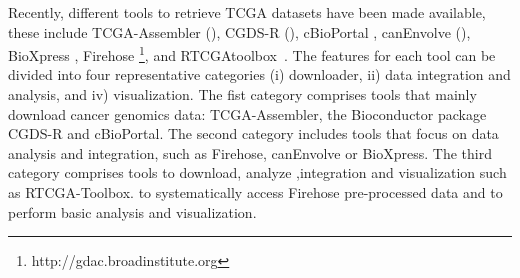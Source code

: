 
Recently, different tools to retrieve TCGA datasets have been made available, these include TCGA-Assembler  (\cite{Zhu14}), CGDS-R (\cite {gao2013integrative}), cBioPortal \cite{cerami2012cbio}, canEnvolve (\cite{samur2013canevolve}), BioXpress \cite{wan2015bioxpress},  Firehose \footnote{http://gdac.broadinstitute.org}, and
RTCGAtoolbox~\cite{samur2014rtcgatoolbox}.
The features for each tool can be divided into four representative categories (i) downloader, ii) data integration and analysis, and iv) visualization. 
The fist category comprises tools that mainly download cancer genomics data: TCGA-Assembler, the Bioconductor package CGDS-R and cBioPortal. 
The second category includes tools that focus on data analysis and integration, such as Firehose, canEnvolve or BioXpress.
The third category comprises tools to download, analyze ,integration and visualization such as RTCGA-Toolbox.
to systematically access Firehose pre-processed data and to perform basic analysis and visualization.

